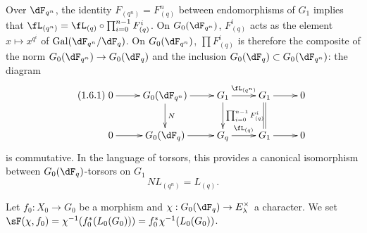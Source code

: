 Over $\dF_{q^n}$, the identity $F_{(q^n)}=F_{(q)}^n$ between endomorphisms of
$G_1$ implies that $\fL_{(q^n)}=\fL_{(q)}\circ \prod_{i=0}^{n-1} F_{(q)}^i$.
On $G_0(\dF_{q^n})$, $F_{(q)}^i$ acts as the element
$x\mapsto x^{q^i}$ of $\gal(\dF_{q^n}/\dF_q)$. On $G_0(\dF_{q^n})$,
$\prod F_{(q)}^i$ is therefore the composite of the norm
$G_0(\dF_{q^n})\to G_0(\dF_q)$ and the inclusion
$G_0(\dF_q)\subset G_0(\dF_{q^n})$: the diagram 
\begin{equation*}\tag{1.6.1}\label{VI:eq:1-6-1}
\xymatrix{
  0 \ar[r] 
    & G_0(\dF_{q^n}) \ar[r] \ar[d]^-N 
    & G_1 \ar[r]^-{\fL_{(q^n)}} \ar[d]^-{\prod_{i=0}^{n-1} F_{(q)}^i} 
    & G_1 \ar[r] \ar@{=}[d] 
    & 0 \\
  0 \ar[r] 
    & G_0(\dF_q) \ar[r] 
    & G_q \ar[r]^-{\fL_{(q)}} 
    & G_1 \ar[r] 
    & 0
}
\end{equation*}
is commutative. In the language of torsors, this provides a canonical
isomorphism between $G_0(\dF_q)$-torsors on $G_1$ 
\begin{equation*}\tag{1.6.2}\label{VI:eq:1-6-2}
  N L_{(q^n)} = L_{(q)} \text{.}
\end{equation*}





\begin{definition_}\label{VI:1-7}
Let $f_0:X_0\to G_0$ be a morphism and
$\chi:G_0(\dF_q)\to E_\lambda^\times$ a character. We set
$\sF(\chi,f_0) = \chi^{-1}(f_0^\ast (L_0(G_0))) = f_0^\ast\chi^{-1}(L_0(G_0))$.
\end{definition_}

